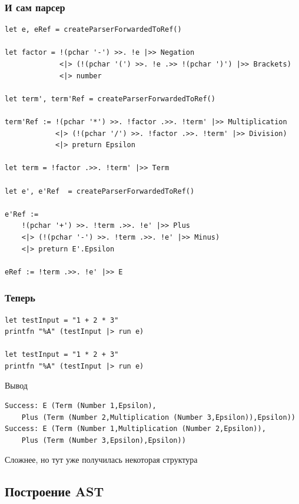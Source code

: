 \documentclass{../../slides-style}
\begin{document}
    \begin{frame}[fragile]
        \frametitle{И сам парсер}
        \begin{scriptsize}
            \begin{verbatim}
let e, eRef = createParserForwardedToRef()

let factor = !(pchar '-') >>. !e |>> Negation
             <|> (!(pchar '(') >>. !e .>> !(pchar ')') |>> Brackets)
             <|> number

let term', term'Ref = createParserForwardedToRef()

term'Ref := !(pchar '*') >>. !factor .>>. !term' |>> Multiplication
            <|> (!(pchar '/') >>. !factor .>>. !term' |>> Division)
            <|> preturn Epsilon

let term = !factor .>>. !term' |>> Term

let e', e'Ref  = createParserForwardedToRef()

e'Ref :=
    !(pchar '+') >>. !term .>>. !e' |>> Plus
    <|> (!(pchar '-') >>. !term .>>. !e' |>> Minus)
    <|> preturn E'.Epsilon

eRef := !term .>>. !e' |>> E
            \end{verbatim}
        \end{scriptsize}
    \end{frame}

    \begin{frame}[fragile]
        \frametitle{Теперь}
        \begin{verbatim}
let testInput = "1 + 2 * 3"
printfn "%A" (testInput |> run e)

let testInput = "1 * 2 + 3"
printfn "%A" (testInput |> run e)
        \end{verbatim}

        \begin{exampleblock}{Вывод}
            \begin{verbatim}
Success: E (Term (Number 1,Epsilon),
    Plus (Term (Number 2,Multiplication (Number 3,Epsilon)),Epsilon))
Success: E (Term (Number 1,Multiplication (Number 2,Epsilon)),
    Plus (Term (Number 3,Epsilon),Epsilon))
            \end{verbatim}
        \end{exampleblock}
        Сложнее, но тут уже получилась некоторая структура
    \end{frame}

    \subsection{Построение AST}
\end{document}
